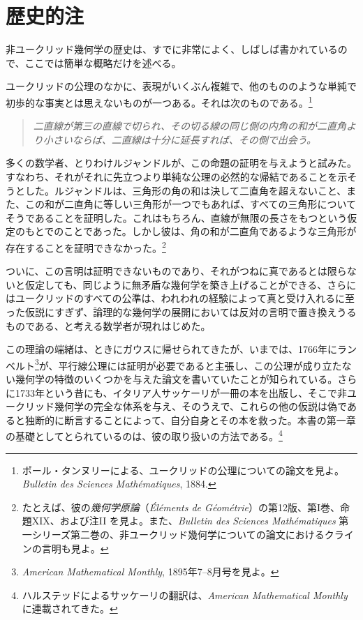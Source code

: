 \chapter{歴史的注}

非ユークリッド幾何学の歴史は、すでに非常によく、しばしば書かれているので、ここでは簡単な概略だけを述べる。

ユークリッドの公理のなかに、表現がいくぶん複雑で、他のもののような単純で初歩的な事実とは思えないものが一つある。それは次のものである。\footnote{ポール・タンヌリーによる、ユークリッドの公理についての論文を見よ。\emph{Bulletin des Sciences Mathématiques}, 1884.}

\begin{quotation}\emph{二直線が第三の直線で切られ、その切る線の同じ側の内角の和が二直角より小さいならば、二直線は十分に延長すれば、その側で出会う。}\end{quotation}

多くの数学者、とりわけルジャンドルが、この命題の証明を与えようと試みた。すなわち、それがそれに先立つより単純な公理の必然的な帰結であることを示そうとした。ルジャンドルは、三角形の角の和は決して二直角を超えないこと、また、この和が二直角に等しい三角形が一つでもあれば、すべての三角形についてそうであることを証明した。これはもちろん、直線が無限の長さをもつという仮定のもとでのことであった。しかし彼は、角の和が二直角であるような三角形が存在することを証明できなかった。\footnote{たとえば、彼の\emph{幾何学原論}（\emph{Éléments de Géométrie}）の第12版、第I巻、命題XIX、および注II を見よ。また、\emph{Bulletin des Sciences Mathématiques} 第一シリーズ第二巻の、非ユークリッド幾何学についての論文におけるクラインの言明も見よ。}

ついに、この言明は証明できないものであり、それがつねに真であるとは限らないと仮定しても、同じように無矛盾な幾何学を築き上げることができる、さらにはユークリッドのすべての公準は、われわれの経験によって真と受け入れるに至った仮説にすぎず、論理的な幾何学の展開においては反対の言明で置き換えうるものである、と考える数学者が現れはじめた。

この理論の端緒は、ときにガウスに帰せられてきたが、いまでは、1766年にランベルト\footnote{\emph{American Mathematical Monthly}, 1895年7--8月号を見よ。}が、平行線公理には証明が必要であると主張し、この公理が成り立たない幾何学の特徴のいくつかを与えた論文を書いていたことが知られている。さらに1733年という昔にも、イタリア人サッケーリが一冊の本を出版し、そこで非ユークリッド幾何学の完全な体系を与え、そのうえで、これらの他の仮説は偽であると独断的に断言することによって、自分自身とその本を救った。本書の第一章の基礎としてとられているのは、彼の取り扱いの方法である。\footnote{ハルステッドによるサッケーリの翻訳は、\emph{American Mathematical Monthly} に連載されてきた。}

